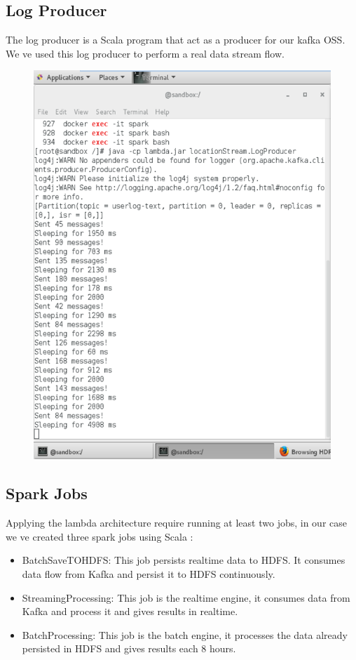 \subsection{Log Producer}
\label{sec:sec01}
The log producer is a Scala program that act as a producer for our kafka OSS. We ve used this log producer to perform
a real data stream flow.
\begin{figure}[h!]
	\centering
	\includegraphics[height=0.6\textheight]{fig01/logProducer}
	\label{fig:FilialesEtClients}
\end{figure}

\subsection{Spark Jobs}
\label{sec:sec01}
Applying the lambda architecture require running at least two jobs, in our case we ve created three spark jobs using Scala :
\begin{itemize}
\item BatchSaveTOHDFS: This job persists realtime data to HDFS. It consumes data flow from Kafka and persist it to HDFS continuously.
\item StreamingProcessing: This job is the realtime engine, it consumes data from Kafka and process it and gives results in realtime. 
\item BatchProcessing: This job is the batch engine, it processes the data already persisted in HDFS and gives results each 8 hours.
\end{itemize}
